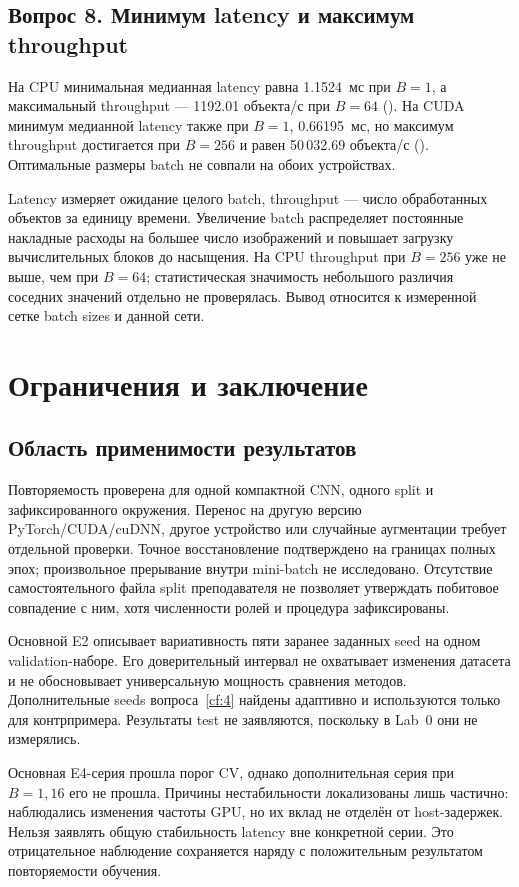 \subsection{Вопрос 8. Минимум latency и максимум throughput}\label{cf:8}
На CPU минимальная медианная latency равна 1.1524~мс при $B=1$, а максимальный throughput --- 1192.01 объекта/с при $B=64$ (). На CUDA минимум медианной latency также при $B=1$, 0.66195~мс, но максимум throughput достигается при $B=256$ и равен 50\,032.69 объекта/с (). Оптимальные размеры batch не совпали на обоих устройствах.

Latency измеряет ожидание целого batch, throughput --- число обработанных объектов за единицу времени. Увеличение batch распределяет постоянные накладные расходы на большее число изображений и повышает загрузку вычислительных блоков до насыщения. На CPU throughput при $B=256$ уже не выше, чем при $B=64$; статистическая значимость небольшого различия соседних значений отдельно не проверялась. Вывод относится к измеренной сетке batch sizes и данной сети.

\clearpage
\section{Ограничения и заключение}
\subsection{Область применимости результатов}
Повторяемость проверена для одной компактной CNN, одного split и зафиксированного окружения. Перенос на другую версию PyTorch/CUDA/cuDNN, другое устройство или случайные аугментации требует отдельной проверки. Точное восстановление подтверждено на границах полных эпох; произвольное прерывание внутри mini-batch не исследовано. Отсутствие самостоятельного файла split преподавателя не позволяет утверждать побитовое совпадение с ним, хотя численности ролей и процедура зафиксированы.

Основной E2 описывает вариативность пяти заранее заданных seed на одном validation-наборе. Его доверительный интервал не охватывает изменения датасета и не обосновывает универсальную мощность сравнения методов. Дополнительные seeds вопроса~\ref{cf:4} найдены адаптивно и используются только для контрпримера. Результаты test не заявляются, поскольку в Lab~0 они не измерялись.

Основная E4-серия прошла порог CV, однако дополнительная серия при $B=1,16$ его не прошла. Причины нестабильности локализованы лишь частично: наблюдались изменения частоты GPU, но их вклад не отделён от host-задержек. Нельзя заявлять общую стабильность latency вне конкретной серии. Это отрицательное наблюдение сохраняется наряду с положительным результатом повторяемости обучения.

